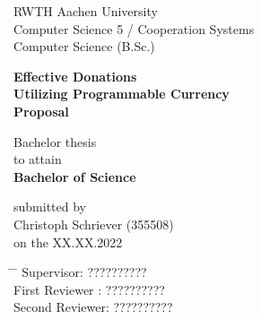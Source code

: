 \begin{titlepage}
    \begin{center}
        \Large
        RWTH Aachen University\\
        Computer Science 5 / Cooperation Systems\\
        Computer Science (B.Sc.)\\
        \vspace{0.5cm} 
        
        \Huge
        \textbf{Effective Donations \\ Utilizing Programmable Currency\\ Proposal}
        \vfill
        
        \LARGE
        Bachelor thesis \\
        to attain\\
        \textbf{Bachelor of Science}
            
        \vspace{0.8cm}
        submitted by \\
        Christoph Schriever (355508)\\
        on the XX.XX.2022\\
    \end{center}

    \Large
    \vspace{1.75cm}
    \begin{tabbing}
    \hspace*{0.5cm}\= \hspace*{6cm} \= \kill
        \>Supervisor:\> ??????????\\
        \>First Reviewer :\> ?????????? \\
        \>Second Reviewer:\> ??????????
    \end{tabbing}
\end{titlepage}